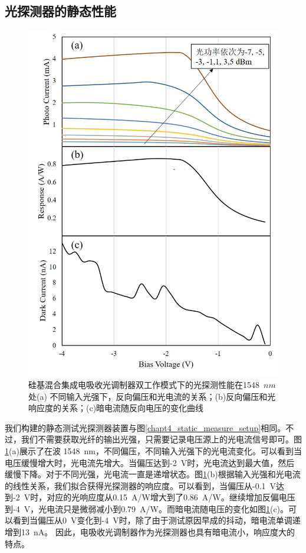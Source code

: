 \subsection{光探测器的静态性能}
\begin{figure}[htb]
	\centering
	\includegraphics[width=12cm]{./Pictures/chapt4_pd_static.jpg}
	\caption{硅基混合集成电吸收光调制器双工作模式下的光探测性能在1548~$n m$处(a) 不同输入光强下，反向偏压和光电流的关系；(b)反向偏压和光响应度的关系；(c)暗电流随反向电压的变化曲线}
	\label{chapt4_pd_static}
\end{figure}
我们构建的静态测试光探测器装置与图\ref{chapt4_static_measure_setup}相同。不过，我们不需要获取光纤的输出光强，只需要记录电压源上的光电流信号即可。图\ref{chapt4_pd_static}(a)展示了在波 1548~nm，不同偏压，不同输入光强下的光电流变化。可以看到当电压缓慢增大时，光电流先增大。当偏压达到-2~V时，光电流达到最大值，然后缓慢下降。对于不同光强，光电流一直是递增状态。图\ref{chapt4_pd_static}(b)根据输入光强和光电流的线性关系，我们拟合获得光探测器的响应度。可以看到，当偏压从-0.1~V达到-2~V时，对应的光响应度从0.15~A/W增大到了0.86~A/W。继续增加反偏电压到-4~V，光电流只是微弱减小到0.79~A/W。而暗电流随电压的变化如图\ref{chapt4_pd_static}(c)。可以看到当偏压从0~V变化到-4~V时，除了由于测试原因早成的抖动，暗电流单调递增到13~nA。 因此，电吸收光调制器作为光探测器也具有暗电流小，响应度大的特点。

